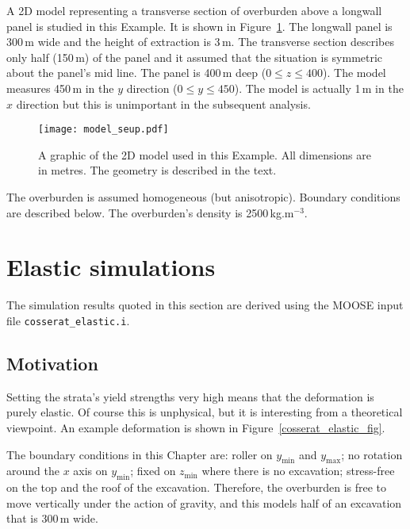 \documentclass[]{scrreprt}
\begin{document}
A 2D model representing a transverse section of overburden above a
longwall panel is studied in this Example.  It is shown in
Figure~\ref{model_setup.fig}.  The longwall panel is 300\,m wide and the height of
extraction is 3\,m.  The transverse section describes only half
(150\,m) of the panel and it assumed that the situation is symmetric
about the panel's mid line.  The panel is 400\,m deep ($0\leq z\leq 400$).  The model
measures 450\,m in the $y$ direction ($0\leq y\leq 450$).  The model
is actually 1\,m in the $x$ direction but this is unimportant in the
subsequent analysis.

\begin{figure}[htb]
\begin{center}
\texttt{[image: model\_seup.pdf]}
\caption{A graphic of the 2D model used in this Example.  All
  dimensions are in metres.  The geometry is described in the text.}
\label{model_setup.fig}
\end{center}
\end{figure}

The overburden is assumed homogeneous (but
anisotropic).  Boundary conditions are described below.  The
overburden's density is 2500\,kg.m$^{-3}$.


\chapter{Elastic simulations}
\label{elastic.chap}

The simulation results quoted in this section are derived using the
MOOSE input file {\tt cosserat\_elastic.i}.

\section{Motivation}

Setting the strata's yield strengths very high means that the
deformation is purely elastic.  Of course this is unphysical, but it
is interesting from a theoretical viewpoint.  An example deformation
is shown in Figure~\ref{cosserat_elastic_fig}.

The boundary conditions in this Chapter are: roller on
$y_{\mathrm{min}}$ and $y_{\mathrm{max}}$; no rotation around the $x$
axis on $y_{\mathrm{min}}$; fixed on $z_{\mathrm{min}}$
where there is no excavation; stress-free on the top and the roof of
the excavation.  Therefore, the overburden is free to move vertically
under the action of gravity, and this models half of an excavation
that is 300\,m wide.
\end{document}
